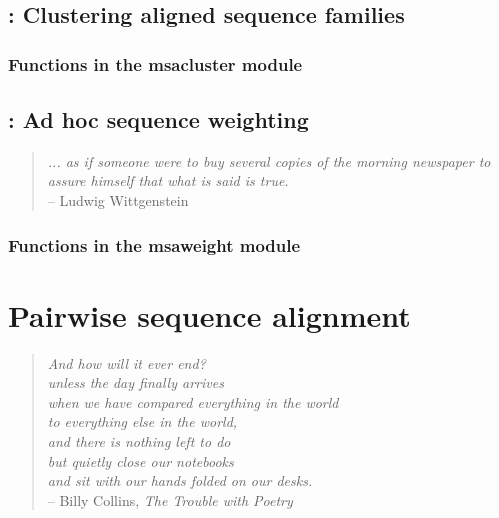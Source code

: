 \documentclass[10pt]{book}
\begin{document}
\newpage
\section{: Clustering aligned sequence families}

\subsection{Functions in the msacluster module}


\newpage
\section{: Ad hoc sequence weighting}
\begin{quote}
 \emph{... as if someone were to buy several copies of the morning
 newspaper to assure himself that what is said is true.}\\
\hspace*{1em}\hfill -- Ludwig Wittgenstein \citep[cited in]{Altschul89}
\end{quote}

\subsection{Functions in the msaweight module}



\chapter{Pairwise sequence alignment}
\begin{quote}
 \emph{And how will it ever end?\\ 
       unless the day finally arrives\\
       when we have compared everything in the world\\
       to everything else in the world,\\
       and there is nothing left to do\\
       but quietly close our notebooks\\
       and sit with our hands folded on our desks.}\\
\hspace*{1em}\hfill -- Billy Collins, \emph{The Trouble with Poetry}
\end{quote}
\end{document}
